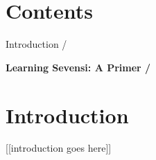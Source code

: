 \emptybreak


\chapter*{Contents}
\thispagestyle{empty}
\begin{table}[hbp]

\begin{small}

Introduction / \pageref{introduction}

\end{small}

\bigskip

\textbf{Learning Sevensi: A Primer / \pageref{text}}

\end{table}

\emptybreak


\pagestyle{plain}
\chapter*{Introduction} \label{introduction}

[[introduction goes here]]

\emptybreak[plain]
